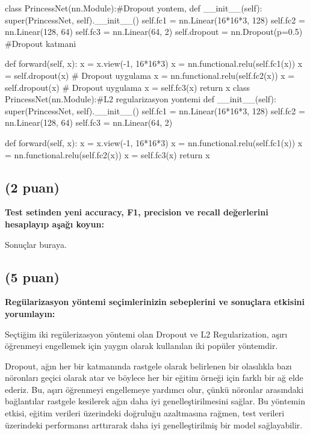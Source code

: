 \documentclass[11pt]{article}
\begin{document}
\begin{python}
class PrincessNet(nn.Module):#Dropout yontem,
    def __init__(self):
        super(PrincessNet, self).__init__()
        self.fc1 = nn.Linear(16*16*3, 128)
        self.fc2 = nn.Linear(128, 64)
        self.fc3 = nn.Linear(64, 2)
        self.dropout = nn.Dropout(p=0.5)  #Dropout katmani

    def forward(self, x):
        x = x.view(-1, 16*16*3)
        x = nn.functional.relu(self.fc1(x))
        x = self.dropout(x)  # Dropout uygulama
        x = nn.functional.relu(self.fc2(x))
        x = self.dropout(x)  # Dropout uygulama
        x = self.fc3(x)
        return x
class PrincessNet(nn.Module):#L2 regularizasyon yontemi
    def __init__(self):
        super(PrincessNet, self).__init__()
        self.fc1 = nn.Linear(16*16*3, 128)
        self.fc2 = nn.Linear(128, 64)
        self.fc3 = nn.Linear(64, 2)

    def forward(self, x):
        x = x.view(-1, 16*16*3)
        x = nn.functional.relu(self.fc1(x))
        x = nn.functional.relu(self.fc2(x))
        x = self.fc3(x)
        return x
\end{python}

\subsection{(2 puan)} \textbf{Test setinden yeni accuracy, F1, precision ve recall değerlerini hesaplayıp aşağı koyun:}

Sonuçlar buraya.

\subsection{(5 puan)} \textbf{Regülarizasyon yöntemi seçimlerinizin sebeplerini ve sonuçlara etkisini yorumlayın:}

Seçtiğim iki regülerizasyon yöntemi olan Dropout ve L2 Regularization, aşırı öğrenmeyi engellemek için yaygın olarak kullanılan iki popüler yöntemdir.

Dropout, ağın her bir katmanında rastgele olarak belirlenen bir olasılıkla bazı nöronları geçici olarak atar ve böylece her bir eğitim örneği için farklı bir ağ elde ederiz. Bu, aşırı öğrenmeyi engellemeye yardımcı olur, çünkü nöronlar arasındaki bağlantılar rastgele kesilerek ağın daha iyi genelleştirilmesini sağlar. Bu yöntemin etkisi, eğitim verileri üzerindeki doğruluğu azaltmasına rağmen, test verileri üzerindeki performansı arttırarak daha iyi genelleştirilmiş bir model sağlayabilir.
\end{document}
